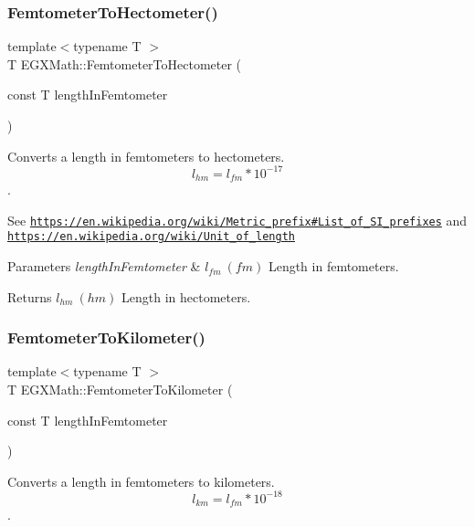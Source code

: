 \subsubsection{\texorpdfstring{Femtometer\+To\+Hectometer()}{FemtometerToHectometer()}}
{\footnotesize\ttfamily template$<$typename T $>$ \\
T E\+G\+X\+Math\+::\+Femtometer\+To\+Hectometer (\begin{DoxyParamCaption}\item[{const T}]{length\+In\+Femtometer }\end{DoxyParamCaption})}



Converts a length in femtometers to hectometers. \[ l_{hm}=l_{fm} * 10^{-17} \]. 

See \href{https://en.wikipedia.org/wiki/Metric_prefix#List_of_SI_prefixes}{\tt https\+://en.\+wikipedia.\+org/wiki/\+Metric\+\_\+prefix\#\+List\+\_\+of\+\_\+\+S\+I\+\_\+prefixes} and \href{https://en.wikipedia.org/wiki/Unit_of_length}{\tt https\+://en.\+wikipedia.\+org/wiki/\+Unit\+\_\+of\+\_\+length} 
\begin{DoxyParams}{Parameters}
{\em length\+In\+Femtometer} & $ l_{fm}\ (fm)$ Length in femtometers. \\
\hline
\end{DoxyParams}
\begin{DoxyReturn}{Returns}
$ l_{hm}\ (hm)$ Length in hectometers. 
\end{DoxyReturn}
\mbox{\label{group___e_g_x_math-_conversions-_length_conversions-_femtometer-_s_i_ga539d33a130ba1069fe9dfaea944cd4ed}} 
\subsubsection{\texorpdfstring{Femtometer\+To\+Kilometer()}{FemtometerToKilometer()}}
{\footnotesize\ttfamily template$<$typename T $>$ \\
T E\+G\+X\+Math\+::\+Femtometer\+To\+Kilometer (\begin{DoxyParamCaption}\item[{const T}]{length\+In\+Femtometer }\end{DoxyParamCaption})}



Converts a length in femtometers to kilometers. \[ l_{km}=l_{fm} * 10^{-18} \]. 

